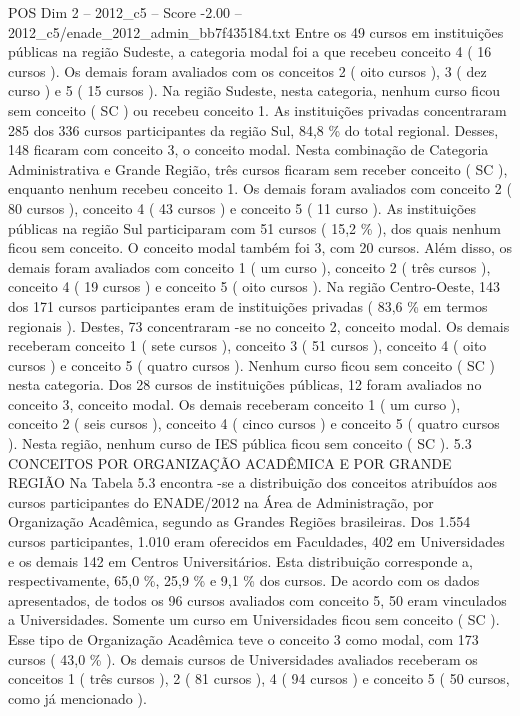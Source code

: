 \begin{textsample}{POS Dim 2 – 2012\_c5 – Score -2.00 – 2012\_c5/enade\_2012\_admin\_bb7f435184.txt}
Entre os 49 cursos em instituições públicas na região Sudeste, a categoria modal foi a que recebeu conceito 4 ( 16 cursos ).
Os demais foram avaliados com os conceitos 2 ( oito cursos ), 3 ( dez curso ) e 5 ( 15 cursos ).
Na região Sudeste, nesta categoria, nenhum curso ficou sem conceito ( SC ) ou recebeu conceito 1.
As instituições privadas concentraram 285 dos 336 cursos participantes da região Sul, 84,8 \% do total regional.
Desses, 148 ficaram com conceito 3, o conceito modal.
Nesta combinação de Categoria Administrativa e Grande Região, três cursos ficaram sem receber conceito ( SC ), enquanto nenhum recebeu conceito 1.
Os demais foram avaliados com conceito 2 ( 80 cursos ), conceito 4 ( 43 cursos ) e conceito 5 ( 11 curso ).
As instituições públicas na região Sul participaram com 51 cursos ( 15,2 \% ), dos quais nenhum ficou sem conceito.
O conceito modal também foi 3, com 20 cursos.
Além disso, os demais foram avaliados com conceito 1 ( um curso ), conceito 2 ( três cursos ), conceito 4 ( 19 cursos ) e conceito 5 ( oito cursos ).
Na região Centro-Oeste, 143 dos 171 cursos participantes eram de instituições privadas ( 83,6 \% em termos regionais ).
Destes, 73 concentraram -se no conceito 2, conceito modal.
Os demais receberam conceito 1 ( sete cursos ), conceito 3 ( 51 cursos ), conceito 4 ( oito cursos ) e conceito 5 ( quatro cursos ).
Nenhum curso ficou sem conceito ( SC ) nesta categoria.
Dos 28 cursos de instituições públicas, 12 foram avaliados no conceito 3, conceito modal.
Os demais receberam conceito 1 ( um curso ), conceito 2 ( seis cursos ), conceito 4 ( cinco cursos ) e conceito 5 ( quatro cursos ).
Nesta região, nenhum curso de IES pública ficou sem conceito ( SC ). 5.3 CONCEITOS POR ORGANIZAÇÃO ACADÊMICA E POR GRANDE REGIÃO Na Tabela 5.3 encontra -se a distribuição dos conceitos atribuídos aos cursos participantes do ENADE/2012 na Área de Administração, por Organização Acadêmica, segundo as Grandes Regiões brasileiras.
Dos 1.554 cursos participantes, 1.010 eram oferecidos em Faculdades, 402 em Universidades e os demais 142 em Centros Universitários.
Esta distribuição corresponde a, respectivamente, 65,0 \%, 25,9 \% e 9,1 \% dos cursos.
De acordo com os dados apresentados, de todos os 96 cursos avaliados com conceito 5, 50 eram vinculados a Universidades.
Somente um curso em Universidades ficou sem conceito ( SC ).
Esse tipo de Organização Acadêmica teve o conceito 3 como modal, com 173 cursos ( 43,0 \% ).
Os demais cursos de Universidades avaliados receberam os conceitos 1 ( três cursos ), 2 ( 81 cursos ), 4 ( 94 cursos ) e conceito 5 ( 50 cursos, como já mencionado ).

\end{textsample}
